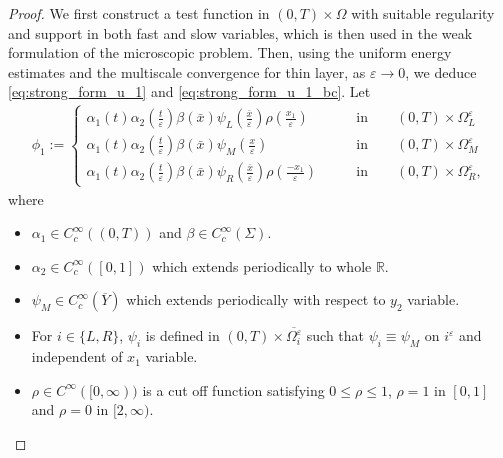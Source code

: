 \documentclass[10pt,a4paper]{amsart}
\def\es{\varepsilon}
\def\oii{\Omega_i^\varepsilon}
\def\oll{\Omega_L^\varepsilon}
\def\omm{\Omega_M^\varepsilon}
\def\orr{\Omega_R^\varepsilon}
\begin{document}
\begin{proof}
    We first construct a test function in $(0,T)\times\Omega$ with suitable regularity and support in both fast and slow variables, which is then used in the weak formulation of the microscopic problem. Then, using the uniform energy estimates and the multiscale convergence for thin layer, as $\es\rightarrow0$, we deduce \eqref{eq:strong_form_u_1} and \eqref{eq:strong_form_u_1_bc}.
Let
\begin{align*}
    \phi_1:=\begin{cases} 
      \alpha_1(t)\alpha_2(\frac{t}{\es})\beta(\bar x) \psi_L(\frac{\bar x}{\es})\rho(\frac{x_1}{\es}) &  \qquad \mbox{in}\qquad (0,T)\times \oll\\
      \alpha_1(t)\alpha_2(\frac{t}{\es})\beta(\bar x) \psi_M(\frac{x}{\es}) & \qquad \mbox{in}\qquad (0,T)\times \omm\\
      \alpha_1(t)\alpha_2(\frac{t}{\es})\beta(\bar x) \psi_R(\frac{\bar x}{\es})\rho(\frac{-x_1}{\es}) & \qquad \mbox{in}\qquad (0,T)\times \orr,
   \end{cases}
\end{align*}
where
\begin{itemize}
    \item $\alpha_1\in C_c^\infty((0,T))$ and $\beta\in C_c^\infty(\Sigma).$
    \item $ \alpha_2\in C_{c}^\infty([0,1])$ which extends periodically to whole $\mathbb{R}.$
    \item $\psi_M\in C_c^\infty(\overline Y) $ which extends periodically with respect to $y_2$ variable.
    \item For $i\in \{L,R\}$, $ \psi_i $ is defined in $(0,T)\times \overline{\oii}$ such that $\psi_i\equiv\psi_M$ on $i^\es$ and independent of $x_1$ variable.
    \item $\rho\in C^\infty([0,\infty))$ is a cut off function satisfying  $0\leq\rho \leq1$, $\rho=1$ in $[0,1]$ and $\rho=0 $ in $[2,\infty).$
\end{itemize}








\end{proof}
\end{document}
